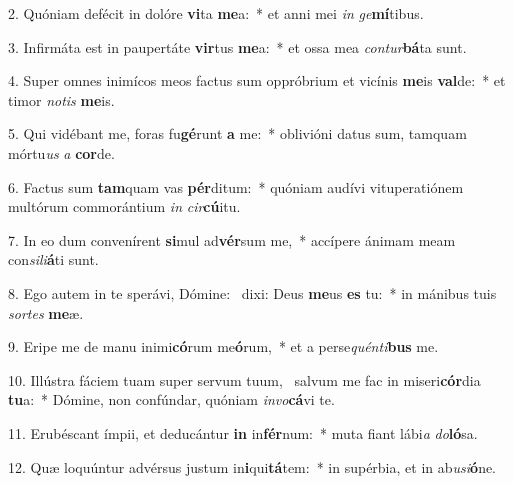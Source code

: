 2. Quóniam defécit in dolóre \textbf{vi}ta \textbf{me}a:~*  et anni mei \textit{in} \textit{ge}\textbf{mí}tibus.\

3. Infirmáta est in paupertáte \textbf{vir}tus \textbf{me}a:~*  et ossa mea \textit{con}\textit{tur}\textbf{bá}ta sunt.\

4. Super omnes inimícos meos factus sum oppróbrium et vicínis \textbf{me}is \textbf{val}de:~*  et timor \textit{no}\textit{tis} \textbf{me}is.\

5. Qui vidébant me, foras fu\textbf{gé}runt \textbf{a} me:~*  oblivióni datus sum, tamquam mórtu\textit{us} \textit{a} \textbf{cor}de.\

6. Factus sum \textbf{tam}quam vas \textbf{pér}ditum:~*  quóniam audívi vituperatiónem multórum commorántium \textit{in} \textit{cir}\textbf{cú}itu.\

7. In eo dum convenírent \textbf{si}mul ad\textbf{vér}sum me,~*  accípere ánimam meam con\textit{si}\textit{li}\textbf{á}ti sunt.\

8. Ego autem in te sperávi, Dómine: \dag\  dixi: Deus \textbf{me}us \textbf{es} tu:~*  in mánibus tuis \textit{sor}\textit{tes} \textbf{me}æ.\

9. Eripe me de manu inimi\textbf{có}rum me\textbf{ó}rum,~*  et a perse\textit{quén}\textit{ti}\textbf{bus} me.\

10. Illústra fáciem tuam super servum tuum, \dag\  salvum me fac in miseri\textbf{cór}dia \textbf{tu}a:~*  Dómine, non confúndar, quóniam \textit{in}\textit{vo}\textbf{cá}vi te.\

11. Erubéscant ímpii, et deducántur \textbf{in} in\textbf{fér}num:~*  muta fiant lábi\textit{a} \textit{do}\textbf{ló}sa.\

12. Quæ loquúntur advérsus justum in\textbf{i}qui\textbf{tá}tem:~*  in supérbia, et in ab\textit{u}\textit{si}\textbf{ó}ne.\

